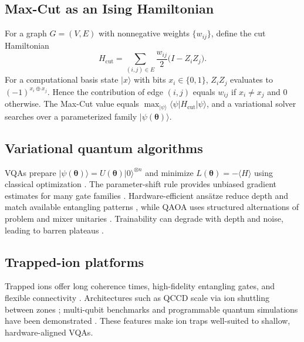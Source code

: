 \subsection{Max-Cut as an Ising Hamiltonian}
For a graph $G=(V,E)$ with nonnegative weights $\{w_{ij}\}$, define the cut Hamiltonian
\begin{equation}
    H_{\mathrm{cut}} = \sum_{(i,j)\in E} \frac{w_{ij}}{2}\bigl(I - Z_i Z_j\bigr).
\end{equation}
For a computational basis state $|x\rangle$ with bits $x_i\in\{0,1\}$, $Z_iZ_j$ evaluates to $(-1)^{x_i\oplus x_j}$. Hence the contribution of edge $(i,j)$ equals $w_{ij}$ if $x_i \neq x_j$ and $0$ otherwise. The Max-Cut value equals $\max_{|\psi\rangle} \langle \psi| H_{\mathrm{cut}}|\psi\rangle$, and a variational solver searches over a parameterized family $|\psi(\boldsymbol{\theta})\rangle$.

\subsection{Variational quantum algorithms}
VQAs prepare $|\psi(\boldsymbol{\theta})\rangle = U(\boldsymbol{\theta})|0\rangle^{\otimes n}$ and minimize $L(\boldsymbol{\theta})=-\langle H\rangle$ using classical optimization \cite{peruzzo2014vqe,cerezo2021variational}. The parameter-shift rule provides unbiased gradient estimates for many gate families \cite{schuld2019gradients,mitarai2018quantum}. Hardware-efficient ans\"atze reduce depth and match available entangling patterns \cite{kandala2017hardware}, while QAOA uses structured alternations of problem and mixer unitaries \cite{farhi2014qaoa,hadfield2019qaoaops}. Trainability can degrade with depth and noise, leading to barren plateaus \cite{mcclean2018barren,arrasmith2021trainability,wang2021noiseplateaus}.

\subsection{Trapped-ion platforms}
Trapped ions offer long coherence times, high-fidelity entangling gates, and flexible connectivity \cite{bruzewicz2019trappedion}. Architectures such as QCCD scale via ion shuttling between zones \cite{pino2021qccd}; multi-qubit benchmarks and programmable quantum simulations have been demonstrated \cite{wright2019benchmarking,zhang2017iontrap}. These features make ion traps well-suited to shallow, hardware-aligned VQAs.

